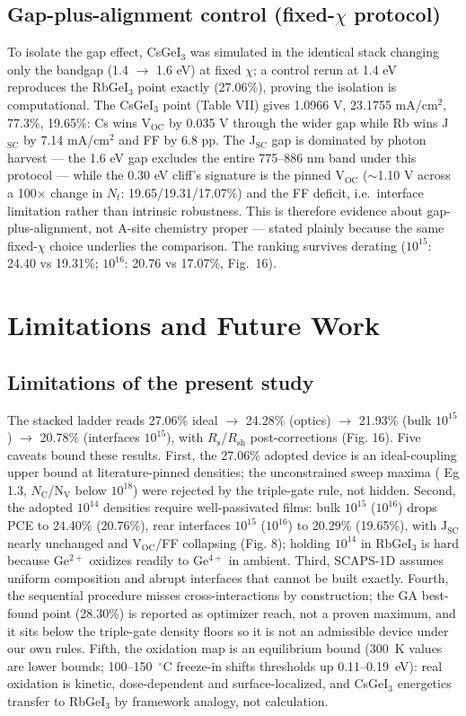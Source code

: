 \documentclass[review]{elsarticle}
\begin{document}
\subsection{Gap-plus-alignment control (fixed-$\chi$ protocol)}
To isolate the gap effect, CsGeI$_{3}$ was simulated in the identical stack changing only the bandgap (1.4 $\rightarrow$ 1.6 eV) at fixed $\chi$; a control rerun at 1.4 eV reproduces the RbGeI$_{3}$ point exactly (27.06\%), proving the isolation is computational. The CsGeI$_{3}$ point (Table VII) gives 1.0966 V, 23.1755 mA/cm$^{2}$, 77.3\%, 19.65\%: Cs wins V$_{\mathrm{OC}}$ by 0.035 V through the wider gap while Rb wins J$_{\mathrm{SC}}$ by 7.14 mA/cm$^{2}$ and FF by 6.8 pp. The J$_{\mathrm{SC}}$ gap is dominated by photon harvest --- the 1.6 eV gap excludes the entire 775--886 nm band under this protocol --- while the 0.30 eV cliff's signature is the pinned V$_{\mathrm{OC}}$ ($\sim$1.10 V across a 100$\times$ change in $N_{t}$: 19.65/19.31/17.07\%) and the FF deficit, i.e.\ interface limitation rather than intrinsic robustness. This is therefore evidence about gap-plus-alignment, not A-site chemistry proper --- stated plainly because the same fixed-$\chi$ choice underlies the comparison. The ranking survives derating ($10^{15}$: 24.40 vs 19.31\%; $10^{16}$: 20.76 vs 17.07\%, Fig.~16).


\section{Limitations and Future Work}

\subsection{Limitations of the present study}
The stacked ladder reads 27.06\% ideal $\rightarrow$ 24.28\% (optics) $\rightarrow$ 21.93\% (bulk $10^{15}$) $\rightarrow$ 20.78\% (interfaces $10^{15}$), with $R_{\mathrm{s}}$/$R_{\mathrm{sh}}$ post-corrections (Fig. 16).
Five caveats bound these results. First, the 27.06\% adopted device is an ideal-coupling upper bound at literature-pinned densities; the unconstrained sweep maxima ( Eg 1.3, $N_{\mathrm{C}}$/N$_{\mathrm{V}}$ below $10^{18}$) were rejected by the triple-gate rule, not hidden. Second, the adopted $10^{14}$ densities require well-passivated films: bulk $10^{15}$ ($10^{16}$) drops PCE to 24.40\% (20.76\%), rear interfaces $10^{15}$ ($10^{16}$) to 20.29\% (19.65\%), with J$_{\mathrm{SC}}$ nearly unchanged and V$_{\mathrm{OC}}$/FF collapsing (Fig. 8); holding $10^{14}$ in RbGeI$_{3}$ is hard because Ge$^{2+}$ oxidizes readily to Ge$^{4+}$ in ambient. Third, SCAPS-1D assumes uniform composition and abrupt interfaces that cannot be built exactly. Fourth, the sequential procedure misses cross-interactions by construction; the GA best-found point (28.30\%) is reported as optimizer reach, not a proven maximum, and it sits below the triple-gate density floors so it is not an admissible device under our own rules. Fifth, the oxidation map is an equilibrium bound (300~K values are lower bounds; 100--150~$^{\circ}$C freeze-in shifts thresholds up 0.11--0.19~eV): real oxidation is kinetic, dose-dependent and surface-localized, and CsGeI$_{3}$ energetics transfer to RbGeI$_{3}$ by framework analogy, not calculation.
\end{document}
